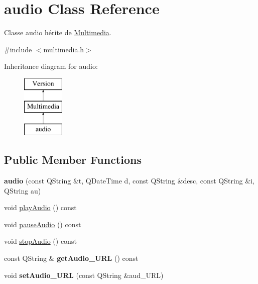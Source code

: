 \hypertarget{classaudio}{}\section{audio Class Reference}
\label{classaudio}


Classe audio hérite de \hyperlink{class_multimedia}{Multimedia}.  




{\ttfamily \#include $<$multimedia.\+h$>$}

Inheritance diagram for audio\+:\begin{figure}[H]
\begin{center}
\leavevmode
\includegraphics[height=3.000000cm]{classaudio}
\end{center}
\end{figure}
\subsection*{Public Member Functions}
\begin{DoxyCompactItemize}
\item 
\mbox{\label{classaudio_a9e7d4c43c9e064e7f0226384d21bed05}} 
{\bfseries audio} (const Q\+String \&t, Q\+Date\+Time d, const Q\+String \&desc, const Q\+String \&i, Q\+String au)
\item 
void \hyperlink{classaudio_afa3edab5ab68f7a2b81add684b420229}{play\+Audio} () const
\item 
void \hyperlink{classaudio_a60e83448a15e15ad9807fe7bfaa1c3a6}{pause\+Audio} () const
\item 
void \hyperlink{classaudio_a0006d6803ff781ff76b8e2fda0924cd0}{stop\+Audio} () const
\item 
\mbox{\label{classaudio_a6023815b556b82d134528ca71382c079}} 
const Q\+String \& {\bfseries get\+Audio\+\_\+\+U\+RL} () const
\item 
\mbox{\label{classaudio_ab7ed38ab7898672a76c76dc53ee015b4}} 
void {\bfseries set\+Audio\+\_\+\+U\+RL} (const Q\+String \&aud\+\_\+\+U\+RL)
\end{DoxyCompactItemize}


